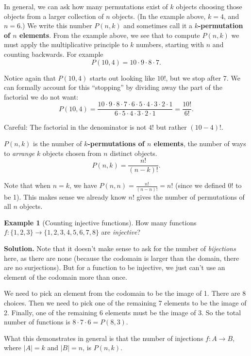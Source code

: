 \documentclass[12pt,]{book}
\newcommand{\terminology}[1]{\textbf{#1}}
\theoremstyle{plain}
\theoremstyle{definition}
\theoremstyle{definition}
\newtheorem{example}[theorem]{Example}
\theoremstyle{definition}
\numberwithin{equation}{chapter}
\newcommand{\card}[1]{\left| #1 \right|}
\begin{document}
\hypertarget{p-936}{}%
In general, we can ask how many permutations exist of \(k\) objects choosing those objects from a larger collection of \(n\) objects. (In the example above, \(k = 4\), and \(n = 6\).) We write this number \(P(n,k)\) and sometimes call it a \terminology{\(k\)-permutation of \(n\) elements}. From the example above, we see that to compute \(P(n,k)\) we must apply the multiplicative principle to \(k\) numbers, starting with \(n\) and counting backwards. For example%
\begin{equation*}
P(10, 4) = 10\cdot 9 \cdot 8 \cdot 7.
\end{equation*}
%
\par
\hypertarget{p-937}{}%
Notice again that \(P(10,4)\) starts out looking like \(10!\), but we stop after 7. We can formally account for this ``stopping'' by dividing away the part of the factorial we do not want:%
\begin{equation*}
P(10,4) = \frac{10\cdot 9 \cdot 8 \cdot 7 \cdot 6 \cdot 5 \cdot 4 \cdot 3 \cdot 2 \cdot 1}{6 \cdot 5 \cdot 4 \cdot 3 \cdot 2 \cdot 1} = \frac{10!}{6!}.
\end{equation*}
%
\par
\hypertarget{p-938}{}%
Careful: The factorial in the denominator is not \(4!\) but rather \((10-4)!\).%
\begin{assemblage}\label{assemblage-22}
\hypertarget{p-939}{}%
 \(P(n,k)\) is the number of \terminology{\(k\)-permutations of \(n\) elements}, the number of ways to \emph{arrange} \(k\) objects chosen from \(n\) distinct objects.%
\begin{equation*}
P(n,k) = \frac{n!}{(n-k)!}.
\end{equation*}
%
\end{assemblage}
\hypertarget{p-940}{}%
Note that when \(n = k\), we have \(P(n,n) = \frac{n!}{(n-n)!} = n!\) (since we defined \(0!\) to be 1). This makes sense \textemdash{}we already know \(n!\) gives the number of permutations of all \(n\) objects.%
\begin{example}[Counting injective functions]\label{example-counting-functions-injective}
\hypertarget{p-941}{}%
How many functions \(f:\{1,2,3\} \to \{1,2,3,4,5,6,7,8\}\) are \emph{injective}?%
\par\smallskip%
\noindent\textbf{Solution.}\hypertarget{solution-105}{}\quad%
\hypertarget{p-942}{}%
Note that it doesn't make sense to ask for the number of \emph{bijections} here, as there are none (because the codomain is larger than the domain, there are no surjections). But for a function to be injective, we just can't use an element of the codomain more than once.%
\par
\hypertarget{p-943}{}%
We need to pick an element from the codomain to be the image of 1. There are 8 choices. Then we need to pick one of the remaining 7 elements to be the image of 2. Finally, one of the remaining 6 elements must be the image of 3. So the total number of functions is \(8\cdot 7 \cdot 6 = P(8,3)\).%
\par
\hypertarget{p-944}{}%
What this demonstrates in general is that the number of injections \(f:A \to B\), where \(\card{A} = k\) and \(\card{B} = n\), is \(P(n,k)\).%
\end{example}
\end{document}
